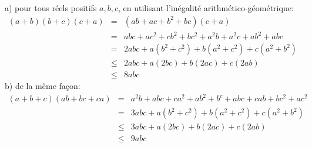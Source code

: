 a) pour tous réels positifs $a,b,c$, en utilisant l'inégalité arithmético-géométrique:
\begin{eqnarray*}
  (a+b)(b+c)(c+a) &=& (ab+ac+b^2+bc)(c+a) \\
  &=& abc + ac^2 + cb^2 + bc^2 + a^2b + a^2c + ab^2 + abc \\
  &=& 2abc + a(b^2+c^2) + b(a^2+c^2)+c(a^2+b^2) \\
  &\leq& 2abc + a(2bc) + b(2ac) + c(2ab) \\
  &\leq& 8abc
\end{eqnarray*}
b) de la même façon:
\begin{eqnarray*}
  (a+b+c)(ab+bc+ca) &=& a^2b+abc+ca^2+ab^2+b^c+abc+cab+bc^2+ac^2 \\
  &=& 3abc + a(b^2+c^2) + b(a^2+c^2)+c(a^2+b^2) \\
  &\leq& 3abc + a(2bc) + b(2ac) + c(2ab) \\
  &\leq& 9abc
\end{eqnarray*}
